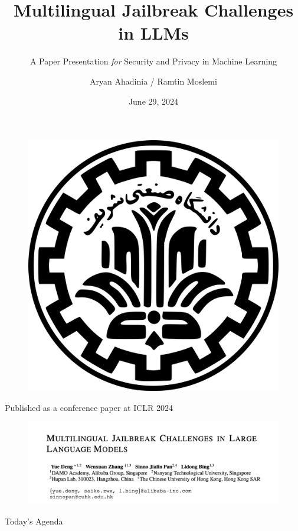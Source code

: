 \documentclass[8pt]{beamer} %
\author{Aryan Ahadinia / Ramtin Moslemi}
\title{Multilingual Jailbreak Challenges in LLMs}
\subtitle{A Paper Presentation \textit{for} Security and Privacy in Machine Learning}
\institute{Department of Computer Engineering, Sharif University of Technology}
\date{June 29, 2024}
\begin{document}
\begin{frame}
    \begin{figure}[htpb]
        \begin{center}
            \includegraphics[keepaspectratio, scale=0.025]{pic/sut-logo.png}
        \end{center}
    \end{figure}
    \titlepage
    \vspace*{-0.6cm}
\end{frame}

\begin{frame}{Published as a conference paper at ICLR 2024}
    \begin{figure}
        \centering
        \includegraphics[width=\linewidth]{pic/Title.png}
        \label{fig:title}
    \end{figure}
\end{frame}

\begin{frame}{Today's Agenda}
    \tableofcontents[sectionstyle=show,
    subsectionstyle=show/shaded/hide,
    subsubsectionstyle=show/shaded/hide]
\end{frame}












\end{document}
